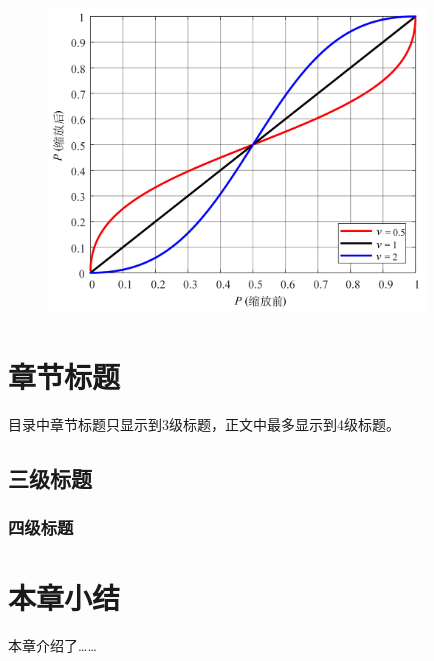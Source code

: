 \begin{figure}[h]
	\centering 
	\includegraphics[width=10cm]{chapters/31}
	\label{fig:2.1}
\end{figure}

\vspace{-0.5cm}

\section{章节标题}
目录中章节标题只显示到3级标题，正文中最多显示到4级标题。

\subsection{三级标题}

\vspace{0.5cm}

\subsubsection{四级标题}

\vspace{0.3cm}



\section{本章小结}
本章介绍了……




